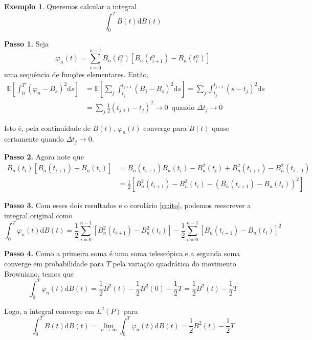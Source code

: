 \documentclass[12pt,a4paper]{article}
\theoremstyle{definition}
\newtheorem{example}{Exemplo}
\begin{document}
\begin{example}
	Queremos calcular a integral
	\[
		\int_0^T B(t) \mathrm{d}B(t)
	\]
		
	\textbf{Passo 1.} Seja
	\[
		\varphi_n(t) = \sum_{i=0}^{n-1} B_n(t_i^n)[B_n(t_{i+1}^n) - B_n(t_i^n)]
	\]
	uma sequência de funções elementares. Então,
	\begin{equation*}
		\begin{aligned}
			\mathbb{E} \left[ \int_0^T (\varphi_n - B_s)^2 \mathrm{d}s \right]
			&= \mathbb{E} \left[ \sum_j \int_{t_j}^{t_{j+1}} (B_j - B_s)^2 \mathrm{d}s \right]
			= \sum_j \int_{t_j}^{t_{j+1}} (s - t_j)^2 \mathrm{d}s \\
			&= \sum_j \frac{1}{2} \left(t_{j+1} - t_j \right)^2 \longrightarrow 0 \, \text{ quando } \Delta t_j \to 0
		\end{aligned}
	\end{equation*}
	
	Isto é, pela continuidade de $B(t)$, $\varphi_n(t)$ converge para $B(t)$ quase certamente quando $\Delta t_j \to 0$.
	
	\textbf{Passo 2.} Agora note que
	\begin{equation*}
		\begin{aligned}
			B_n(t_i)[B_n(t_{i+1}) - B_n(t_i)] &= B_n(t_{i+1}) B_n(t_i) - B_n^2(t_i) + B_n^2(t_{i+1}) - B_n^2(t_{i+1}) \\
			&= \frac{1}{2} [B_n^2(t_{i+1}) - B_n^2(t_i) - (B_n(t_{i+1}) - B_n(t_i))^2 ]
		\end{aligned}
	\end{equation*}
	
	\textbf{Passo 3.} Com esses dois resultados e o corolário \eqref{cr:ito}, podemos reescrever a integral original como
	\[
		\int_0^T \varphi_n(t) \mathrm{d}B(t) = \frac{1}{2} \sum_{i=0}^{n-1} \left[ B_n^2(t_{i+1}) - B_n^2(t_i) \right] - \frac{1}{2} \sum_{i=0}^{n-1} \left[ B_n(t_{i+1}) - B_n(t_i) \right]^2
	\]
	
	\textbf{Passo 4.} Como a primeira soma é uma soma telescópica e a segunda soma converge em probabilidade para $T$ pela variação quadrática do movimento Browniano, temos que
	\[
		\int_0^T \varphi_n(t) \mathrm{d}B(t) = \frac{1}{2} B^2(t) - \frac{1}{2} B^2(0) - \frac{1}{2}T = \frac{1}{2} B^2(t) - \frac{1}{2}T 
	\]
	
	Logo, a integral converge em $L^2(P)$ para
	\begin{equation}
		\int_0^T B(t) \mathrm{d}B(t) = \lim_{n \to \infty} \int_0^T \varphi_n(t) \mathrm{d}B(t) = \frac{1}{2} B^2(t) - \frac{1}{2}T 
	\end{equation}
\end{example}
\end{document}
